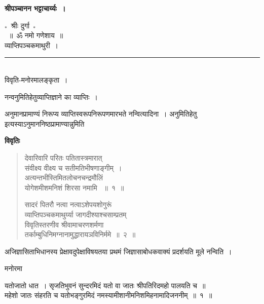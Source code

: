 \documentclass[10pt, openany]{book}
\begin{document}
\hfill {\Large \textbf{श्रीपञ्चानन भट्टाचार्य्यः~।}
\newpage
\fancyhead[C]{}  
\begin{center}
\doublespacing
{\Huge $_{*}$}~श्रीः दुर्गा~{\Huge $_{*}$}\\
~॥~ॐ नमो गणेशाय~॥\\
{\LARGE व्याप्तिपञ्चकमाथुरी~।} 

\rule{.1\linewidth}{1pt}\\
\vspace{1mm}
{\large विवृति-मनोरमालङ्कृता~।}
\end{center}




{\qt नन्वनुमितिहेतुव्याप्तिज्ञाने का व्याप्तिः~।}

अनुमानप्रामाण्यं निरूप्य व्याप्तिस्वरूपनिरूपणमारभते {\la नन्वित्यादिना~।} अनुमितिहेतु इत्यस्याऽनुमाननिष्ठप्रामाण्यान्नुमिति
\begin{center}
   \textbf{ विवृतिः}
\end{center}

\begin{quote}
{\vp देवारिवारि परितः पतितास्त्रमारात्\\
संवीक्ष्य वीक्ष्य च सतीमतिभीषणाङ्गीम्~।\\
अत्यन्तभीस्तिमितलोचनचन्द्रमौलिं\\
योगेशमीशमनिशं शिरसा नमामि ~॥~१~॥

सादरं पितरौ नत्वा नत्वाऽशेपयशोगुरूं\\
व्याप्तिपञ्चकमाथुर्य्या जागदीश्याश्चसाम्प्रतम्\\
 विवृतिस्तरणीव श्रीवामाचरणशर्मणा    \\
तर्काम्बुधिनिमग्नानामुद्धारायञविनिर्ममे~॥~२~॥}
\end{quote}

अजिज्ञासिताभिधानस्य प्रेक्षावदुपेक्षाविषयतया प्रथमं जिज्ञासाबोधकवाक्यं
प्रदर्शयति मूले नन्विति~।

\begin{center}   मनोरमा  \end{center}

यतोजातो धात~। सृजतिभुवनं सुन्दरमिदं  यतो वा जातः श्रीपतिरिदमहो पालयति च~॥\\
\indent महेशो जातः संहरति च यतोभङ्गुरमिदं नमस्यामीशानीमनिशमिहनामादिजननीम्~॥~१~॥\\

}
\end{document}
